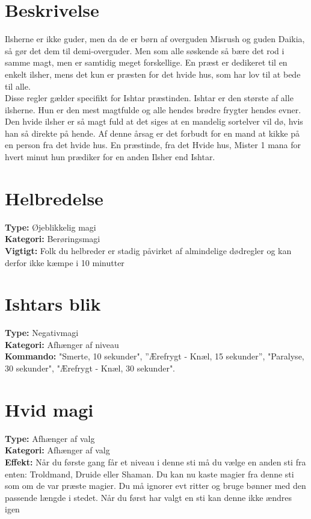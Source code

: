 \section{Beskrivelse}
Ilsherne er ikke guder, men da de er børn af overguden Misrush og guden Daikia, så gør det dem til demi-overguder. Men som alle søskende så bære det rod i samme magt, men er samtidig meget forskellige. En præst er dedikeret til en enkelt ilsher, mens det kun er præsten for det hvide hus, som har lov til at bede til alle.\\ 
Disse regler gælder specifikt for Ishtar præstinden. Ishtar er den største af alle ilsherne. Hun er den mest magtfulde og alle hendes brødre frygter hendes evner. Den hvide ilsher er så magt fuld at det siges at en mandelig sortelver vil dø, hvis han så direkte på hende. Af denne årsag er det forbudt for en mand at kikke på en person fra det hvide hus. En præstinde, fra det Hvide hus, Mister 1 mana for hvert minut hun prædiker for en anden Ilsher end Ishtar.

\section{Helbredelse}
\textbf{Type:} Øjeblikkelig magi \\
\textbf{Kategori:} Berøringsmagi\\
\textbf{Vigtigt:} Folk du helbreder er stadig påvirket af almindelige dødregler og kan derfor ikke kæmpe i 10 minutter


\section{Ishtars blik}
\textbf{Type:} Negativmagi\\
\textbf{Kategori:} Afhænger af niveau\\
\textbf{Kommando:} "Smerte, 10 sekunder", ”Ærefrygt - Knæl, 15 sekunder”, "Paralyse, 30 sekunder", "Ærefrygt - Knæl, 30 sekunder".


\section{Hvid magi}
\textbf{Type:} Afhænger af valg\\
\textbf{Kategori:} Afhænger af valg \\
\textbf{Effekt:} Når du første gang får et niveau i denne sti må du vælge en anden sti fra enten: Troldmand, Druide eller Shaman. Du kan nu kaste magier fra denne sti som om de var præste magier. Du må ignorer evt ritter og bruge bønner med den passende længde i stedet. Når du først har valgt en sti kan denne ikke ændres igen

